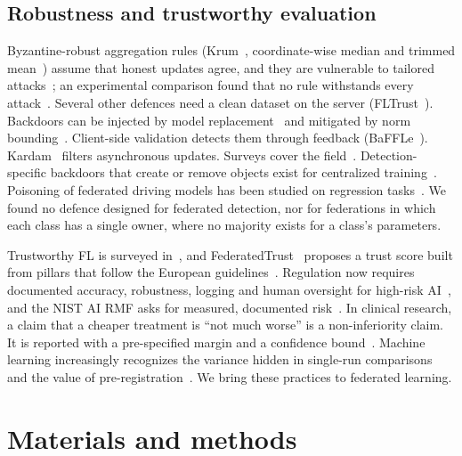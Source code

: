 \documentclass[pdflatex,sn-mathphys-num]{sn-jnl}
\begin{document}
\subsection{Robustness and trustworthy evaluation}
Byzantine-robust aggregation rules (Krum~\cite{blanchard2017krum}, coordinate-wise median and trimmed mean~\cite{yin2018byzantine}) assume that honest updates agree, and they are vulnerable to tailored attacks~\cite{fang2020local}; an experimental comparison found that no rule withstands every attack~\cite{li2024byzantinestudy}. Several other defences need a clean dataset on the server (FLTrust~\cite{cao2021fltrust}). Backdoors can be injected by model replacement~\cite{bagdasaryan2020backdoor} and mitigated by norm bounding~\cite{sun2019backdoor}. Client-side validation detects them through feedback (BaFFLe~\cite{andreina2021baffle}). Kardam~\cite{damaskinos2018kardam} filters asynchronous updates. Surveys cover the field~\cite{xia2023poisoningsurvey}. Detection-specific backdoors that create or remove objects exist for centralized training~\cite{chan2022baddet}. Poisoning of federated driving models has been studied on regression tasks~\cite{garg2024poisoningad}. We found no defence designed for federated detection, nor for federations in which each class has a single owner, where no majority exists for a class's parameters.

Trustworthy FL is surveyed in~\cite{tariq2023trustworthy}, and FederatedTrust~\cite{sanchez2023federatedtrust} proposes a trust score built from pillars that follow the European guidelines~\cite{hleg2019ethics}. Regulation now requires documented accuracy, robustness, logging and human oversight for high-risk AI~\cite{euaiact2024}, and the NIST AI RMF asks for measured, documented risk~\cite{nist2023rmf}. In clinical research, a claim that a cheaper treatment is ``not much worse'' is a non-inferiority claim. It is reported with a pre-specified margin and a confidence bound~\cite{piaggio2012consort}. Machine learning increasingly recognizes the variance hidden in single-run comparisons~\cite{bouthillier2021variance} and the value of pre-registration~\cite{nosek2018prereg}. We bring these practices to federated learning.

\section{Materials and methods}\label{sec:methods}
\end{document}
